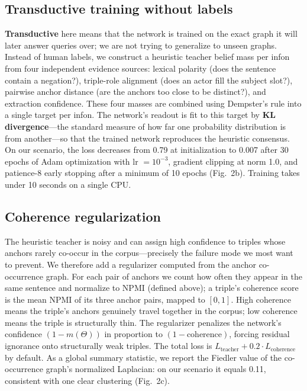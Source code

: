 \documentclass[11pt,a4paper]{article}
\begin{document}
\subsection{Transductive training without labels}

\textbf{Transductive} here means that the network is trained on
the exact graph it will later answer queries over; we are not
trying to generalize to unseen graphs. Instead of human labels,
we construct a heuristic teacher belief mass per infon from four
independent evidence sources: lexical polarity (does the
sentence contain a negation?), triple-role alignment (does an
actor fill the subject slot?), pairwise anchor distance (are the
anchors too close to be distinct?), and extraction confidence.
These four masses are combined using Dempster's rule into a
single target per infon. The network's readout is fit to this
target by \textbf{KL divergence}---the standard measure of how
far one probability distribution is from another---so that the
trained network reproduces the heuristic consensus. On our
scenario, the loss decreases from 0.79 at initialization to
0.007 after 30 epochs of Adam optimization with lr $=10^{-3}$,
gradient clipping at norm 1.0, and patience-8 early stopping
after a minimum of 10 epochs (Fig.~2b). Training takes under
10 seconds on a single CPU.

\subsection{Coherence regularization}

The heuristic teacher is noisy and can assign high confidence to
triples whose anchors rarely co-occur in the corpus---precisely
the failure mode we most want to prevent. We therefore add a
regularizer computed from the anchor co-occurrence graph. For
each pair of anchors we count how often they appear in the same
sentence and normalize to NPMI (defined above); a triple's
coherence score is the mean NPMI of its three anchor pairs,
mapped to $[0, 1]$. High coherence means the triple's anchors
genuinely travel together in the corpus; low coherence means the
triple is structurally thin. The regularizer penalizes the
network's confidence $(1 - m(\Theta))$ in proportion to
$(1 - \text{coherence})$, forcing residual ignorance onto
structurally weak triples. The total loss is $L_{\text{teacher}}
+ 0.2 \cdot L_{\text{coherence}}$ by default. As a global
summary statistic, we report the Fiedler value of the
co-occurrence graph's normalized Laplacian: on our scenario it
equals 0.11, consistent with one clear clustering (Fig.~2c).
\end{document}
